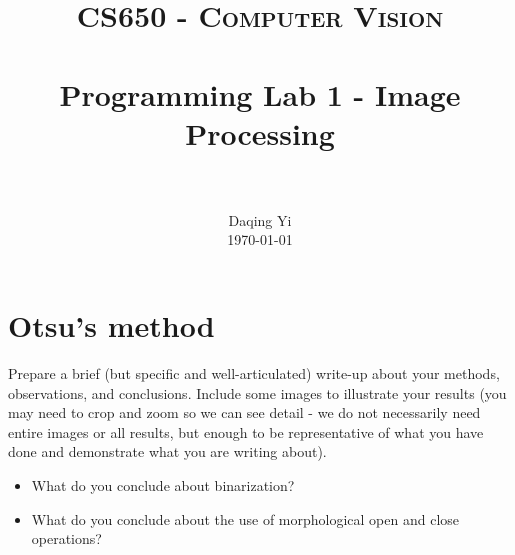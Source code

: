 \documentclass[paper=a4, fontsize=11pt]{scrartcl}
\title{
		\usefont{OT1}{bch}{b}{n}
		\normalfont \normalsize \textsc{CS650 - Computer Vision} \\ [25pt]
		\horrule{0.5pt} \\[0.4cm]
		\huge Programming Lab 1 - Image Processing \\
		\horrule{2pt} \\[0.5cm]
}
\author{
		\normalfont 								\normalsize
        Daqing Yi\\[-3pt]		\normalsize
        \today
}
\date{}
\numberwithin{equation}{section}		%
\numberwithin{figure}{section}			%
\numberwithin{table}{section}				%
\begin{document}
\maketitle
\section{Otsu's method}

Prepare a brief (but specific and well-articulated) write-up about your methods, observations, and conclusions.
Include some images to illustrate your results (you may need to crop and zoom so we can see detail - we do not necessarily need entire images or all results, but enough to be representative of what you have done and demonstrate what you are writing about).

\begin{itemize}
\item What do you conclude about binarization? 
\item What do you conclude about the use of morphological open and close operations?
\end{itemize}
\end{document}
